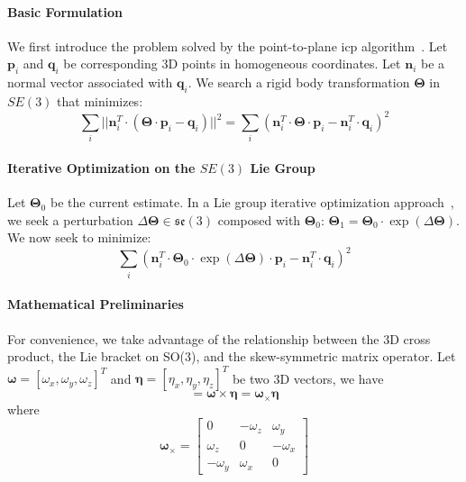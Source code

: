 
\paragraph{Basic Formulation}
We first introduce the problem solved by the point-to-plane \gls{icp} algorithm~\cite{Rusinkiewicz:IC3DIM:2001}.
Let $\mathbf{p}_i$ and $\mathbf{q}_i$ be corresponding 3D points in homogeneous coordinates. Let $\mathbf{n}_i$ be a normal vector associated with $\mathbf{q}_i$. We search a rigid body transformation $\mathbf{\Theta}$ in $SE(3)$ that minimizes:
\begin{equation}
\sum_i ||\mathbf{n}_i^T \cdot (\mathbf{\Theta} \cdot \mathbf{p}_i - \mathbf{q}_i)||^2 = \sum_i (\mathbf{n}_i^T \cdot \mathbf{\Theta} \cdot \mathbf{p}_i - \mathbf{n}_i^T \cdot \mathbf{q}_i)^2
\end{equation}

\paragraph{Iterative Optimization on the $SE(3)$ Lie Group}
Let $\mathbf{\Theta}_0$ be the current estimate. In a Lie group iterative optimization approach~\cite{Mahony:JGO:2002,Vercauteren:IPMI:2007}, we seek a perturbation $\Delta\mathbf{\Theta} \in \mathfrak{se}(3)$ composed with
$\mathbf{\Theta}_0$: $\mathbf{\Theta}_1 = \mathbf{\Theta}_0 \cdot \exp(\Delta\mathbf{\Theta})$. We now seek to minimize:
\begin{equation}
\sum_i (\mathbf{n}_i^T \cdot \mathbf{\Theta}_0 \cdot \exp(\Delta\mathbf{\Theta}) \cdot \mathbf{p}_i - \mathbf{n}_i^T \cdot \mathbf{q}_i)^2
\end{equation}

\paragraph{Mathematical Preliminaries}
For convenience, we take advantage of the relationship between the 3D cross product, the Lie bracket on SO(3), and the skew-symmetric matrix operator.
Let $\mathbf{\omega} = [\omega_x, \omega_y, \omega_z]^T$ and $\mathbf{\eta} = [\eta_x, \eta_y, \eta_z]^T$ be two 3D vectors, we have
\begin{equation}
[\mathbf{\omega}, \mathbf{\eta}] = \mathbf{\omega} \times \mathbf{\eta} = \mathbf{\omega}_\times \mathbf{\eta}
\end{equation}
where
\begin{equation}
\mathbf{\omega}_\times =
\begin{bmatrix}
0         & -\omega_z & \omega_y \\
\omega_z  & 0         & -\omega_x \\
-\omega_y & \omega_x  & 0
\end{bmatrix}
\end{equation}

